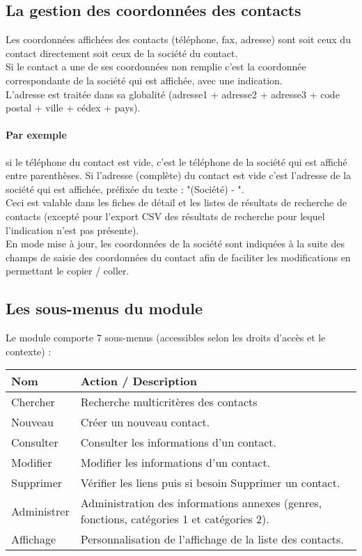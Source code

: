 \subsection{La gestion des coordonnées des contacts}

Les coordonnées affichées des contacts (téléphone, fax, adresse) sont soit ceux du contact directement soit ceux de la société du contact.\\

Si le contact a une de ses coordonnées non remplie c'est la coordonnée correspondante de la société qui est affichée, avec une indication.\\

L'adresse est traitée dans sa globalité (adresse1 + adresse2 + adresse3 + code postal + ville + cédex + pays).

\paragraph{Par exemple} si le téléphone du contact est vide, c'est le téléphone de la société qui est affiché entre parenthèses.
Si l'adresse (complète) du contact est vide c'est l'adresse de la société qui est affichée, préfixée du texte : "(Société) - ".\\

Ceci est valable dans les fiches de détail et les listes de résultats de recherche de contacts (excepté pour l'export CSV des résultats de recherche pour lequel l'indication n'est pas présente).\\

En mode mise à jour, les coordonnées de la société sont indiquées à la suite des champs de saisie des coordonnées du contact afin de faciliter les modifications en permettant le copier / coller.


\subsection{Les sous-menus du module \contact}

Le module \contact comporte 7 sous-menus (accessibles selon les droits d'accès et le contexte) :\\

\begin{tabular}{|p{2.5cm}|p{9.5cm}|}
\hline
\textbf{Nom} & \textbf{Action / Description} \\
\hline
Chercher & Recherche multicritères des contacts \\
\hline
Nouveau & Créer un nouveau contact.\\
\hline
Consulter & Consulter les informations d'un contact.\\
\hline
Modifier & Modifier les informations d'un contact.\\
\hline
Supprimer & Vérifier les liens puis si besoin Supprimer un contact.\\
\hline
Administrer & Administration des informations annexes (genres, fonctions, catégories 1 et catégories 2).\\
\hline
Affichage & Personnalisation de l'affichage de la liste des contacts.\\
\hline
\end{tabular}


